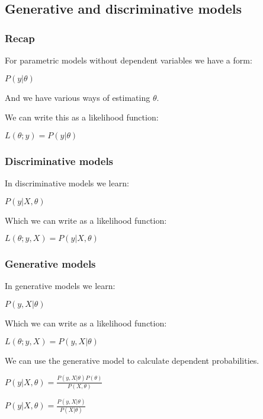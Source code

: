 
\subsection{Generative and discriminative models}

\subsubsection{Recap}

For parametric models without dependent variables we have a form:

\(P(y| \theta )\)

And we have various ways of estimating \(\theta \).

We can write this as a likelihood function:

\(L(\theta ;y )=P(y|\theta)\)

\subsubsection{Discriminative models}

In discriminative models we learn:

\(P(y|X, \theta )\)

Which we can write as a likelihood function:

\(L(\theta ;y, X )=P(y| X, \theta)\)

\subsubsection{Generative models}

In generative models we learn:

\(P(y, X| \theta )\)

Which we can write as a likelihood function:

\(L(\theta ;y, X )=P(y, X|\theta)\)

We can use the generative model to calculate dependent probabilities.

\(P(y| X, \theta )=\frac{P(y, X| \theta )P(\theta )}{P(X, \theta )}\)

\(P(y| X, \theta )=\frac{P(y, X| \theta )}{P(X| \theta )}\)

